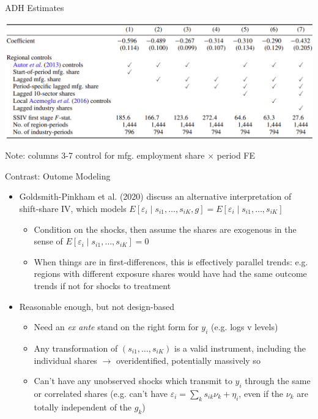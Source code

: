 \documentclass[11pt,english]{beamer}
\begin{document}
\begin{frame}{ADH Estimates}

\begin{center}
	\includegraphics[width=1\textwidth]{figures/adh_bhj.png}
\end{center}

Note: columns 3-7 control for mfg. employment share $\times$ period FE


\end{frame}

\begin{frame}{Contrast: Outome Modeling}
\begin{itemize}
\item Goldsmith-Pinkham et al. (2020) discuss an alternative interpretation of shift-share IV, which models $E[\varepsilon_i\mid s_{i1},\dots,s_{iK},g]=E[\varepsilon_i\mid s_{i1},\dots,s_{iK}]$\smallskip
\begin{itemize}
\item Condition on the shocks, then assume the shares are exogenous in the sense of $E[\varepsilon_i\mid s_{i1},\dots,s_{iK}]=0$\smallskip
\item When things are in first-differences, this is effectively parallel trends: e.g. regions with different exposure shares would have had the same outcome trends if not for shocks to treatment
\end{itemize}\bigskip\pause{}
\item Reasonable enough, but not design-based\smallskip
\begin{itemize}
\item Need an \emph{ex ante} stand on the right  form for $y_i$ (e.g. logs v levels)\smallskip
\item Any transformation of $(s_{i1},\dots,s_{iK})$ is a valid instrument, including the individual shares $\rightarrow$ overidentified, potentially massively so\smallskip
\item Can't have any unobserved shocks which transmit to $y_i$ through the same or correlated shares (e.g. can't have $\varepsilon_i=\sum_k s_{ik}\nu_k + \eta_i$, even if the $\nu_k$ are totally independent of the $g_k$)
\end{itemize}
\end{itemize}
\end{frame}
\end{document}
